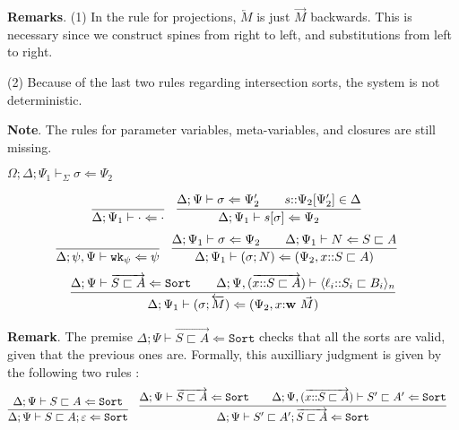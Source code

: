 \documentclass[letterpaper, 11pt]{article}
\newcommand{\Lar}{\Leftarrow}
\newcommand{\Sort}{\texttt{Sort}}
\newcommand{\wk}{\texttt{wk}}
\begin{document}
    \textbf{Remarks}. (1) In the rule for projections, $\overleftarrow{M}$ is just $\vec{M}$ backwards.  This is necessary since we construct spines
    from right to left, and substitutions from left to right.

    (2) Because of the last two rules regarding intersection sorts, the system is not deterministic.

    \textbf{Note}.  The rules for parameter variables, meta-variables, and closures are still missing.  

    $\boxed{\Omega; \Delta; \Psi_1 \vdash_\Sigma \sigma \Lar \Psi_2}$

    \begin{align*}
      & \infer{\Delta; \Psi_1 \vdash \cdot \Lar \cdot}{} &
      & \infer{\Delta; \Psi_1 \vdash s[\sigma] \Lar \Psi_2}
        {
          \Delta; \Psi \vdash \sigma \Lar \Psi_2'
          &&
          s{::}\Psi_2[\Psi_2'] \in \Delta
        }
    \end{align*}
    \begin{align*}
      & \infer{\Delta; \psi, \Psi \vdash \wk_\psi \Lar \psi}{} &
      & \infer{\Delta; \Psi_1 \vdash (\sigma; N) \Lar (\Psi_2, x{::}S \sqsubset A)}
        {
          \Delta; \Psi_1 \vdash \sigma \Lar \Psi_2
          &&
          \Delta; \Psi_1 \vdash N \Lar S \sqsubset A
        }
    \end{align*}
    \begin{align*}
      \infer{\Delta; \Psi_1 \vdash (\sigma; \overleftarrow{M}) \Lar (\Psi_2, x{:} \textbf{w} \ \vec{M})}
            {
              \Delta; \Psi \vdash \overrightarrow{S \sqsubset A} \Lar \Sort
              &&
              \Delta; \Psi, (\overrightarrow{x{::}S \sqsubset A}) \vdash \langle \ell_i {::} S_i \sqsubset B_i \rangle_n
            }
    \end{align*}

    \textbf{Remark}.  The premise $\Delta; \Psi \vdash \overrightarrow{S \sqsubset A} \Lar \Sort$ checks that all the sorts are valid, given that 
    the previous ones are.  Formally, this auxilliary judgment is given by the following two rules :
    \begin{align*}
      & \infer{\Delta; \Psi \vdash S \sqsubset A ; \varepsilon \Lar \Sort}{ \Delta; \Psi \vdash S \sqsubset A \Lar \Sort} &
      & \infer{\Delta; \Psi \vdash S' \sqsubset A' ; \overrightarrow{S \sqsubset A} \Lar \Sort}
        {
          \Delta; \Psi \vdash \overrightarrow{S \sqsubset A} \Lar \Sort
          &&
          \Delta; \Psi, (\overrightarrow{x{::}S \sqsubset A}) \vdash S' \sqsubset A' \Lar \Sort
        }
    \end{align*}
\end{document}
